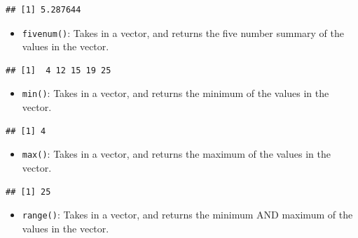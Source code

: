 \documentclass[
]{book}
\newenvironment{Shaded}{\begin{snugshade}}{\end{snugshade}}
\newcommand{\KeywordTok}[1]{\textcolor[rgb]{0.13,0.29,0.53}{\textbf{#1}}}
\newcommand{\NormalTok}[1]{#1}
\newcommand{\OperatorTok}[1]{\textcolor[rgb]{0.81,0.36,0.00}{\textbf{#1}}}
\providecommand{\tightlist}{%
  \setlength{\itemsep}{0pt}\setlength{\parskip}{0pt}}
\begin{document}
\begin{verbatim}
## [1] 5.287644
\end{verbatim}

\begin{itemize}
\tightlist
\item
  \texttt{fivenum()}: Takes in a vector, and returns the five number summary of the values in the vector.
\end{itemize}

\begin{Shaded}
\end{Shaded}

\begin{verbatim}
## [1]  4 12 15 19 25
\end{verbatim}

\begin{itemize}
\tightlist
\item
  \texttt{min()}: Takes in a vector, and returns the minimum of the values in the vector.
\end{itemize}

\begin{Shaded}
\end{Shaded}

\begin{verbatim}
## [1] 4
\end{verbatim}

\begin{itemize}
\tightlist
\item
  \texttt{max()}: Takes in a vector, and returns the maximum of the values in the vector.
\end{itemize}

\begin{Shaded}
\end{Shaded}

\begin{verbatim}
## [1] 25
\end{verbatim}

\begin{itemize}
\tightlist
\item
  \texttt{range()}: Takes in a vector, and returns the minimum AND maximum of the values in the vector.
\end{itemize}
\end{document}
